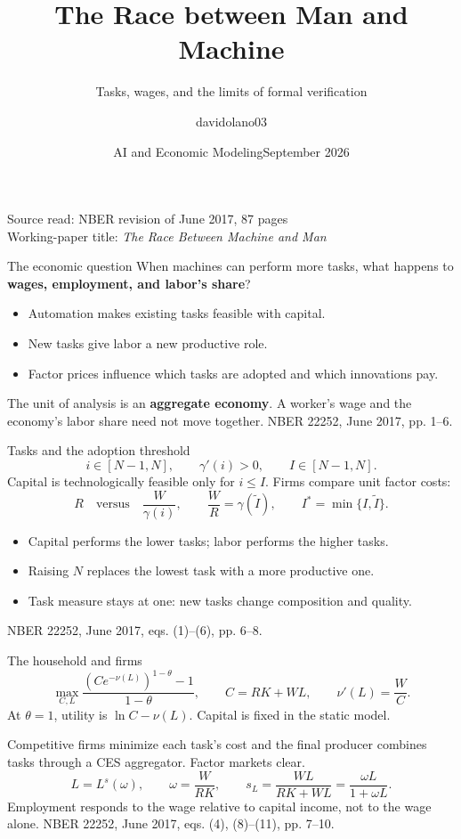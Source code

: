 \documentclass[aspectratio=169,11pt]{beamer}
\title{The Race between Man and Machine}
\subtitle{Tasks, wages, and the limits of formal verification}
\author{davidolano03}
\institute{Acemoglu \& Restrepo (2018), American Economic Review\\[5pt]
\href{https://github.com/davidolano03/ai-06-restrepo}{\texttt{github.com/davidolano03/ai-06-restrepo}}}
\date{AI and Economic Modeling\quad September 2026}
\newcommand{\src}[1]{\vfill{\scriptsize\color{gray}NBER 22252, June 2017, #1.}}
\begin{document}
\begin{frame}\titlepage
\vspace{-5mm}\centering\footnotesize Source read: NBER revision of June 2017, 87 pages\\
Working-paper title: \emph{The Race Between Machine and Man}
\end{frame}

\begin{frame}{The economic question}
When machines can perform more tasks, what happens to \textbf{wages, employment, and labor's share}?
\par\medskip
\begin{itemize}
\item Automation makes existing tasks feasible with capital.
\item New tasks give labor a new productive role.
\item Factor prices influence which tasks are adopted and which innovations pay.
\end{itemize}
\par\medskip
The unit of analysis is an \textbf{aggregate economy}. A worker's wage and the economy's labor share need not move together.
\src{pp. 1--6}
\end{frame}

\begin{frame}{Tasks and the adoption threshold}
\[
i\in[N-1,N],\qquad \gamma'(i)>0,\qquad I\in[N-1,N].
\]
Capital is technologically feasible only for $i\le I$. Firms compare unit factor costs:
\[
R\quad\text{versus}\quad\frac{W}{\gamma(i)},\qquad
\frac W R=\gamma(\widetilde I),\qquad I^*=\min\{I,\widetilde I\}.
\]
\begin{itemize}
\item Capital performs the lower tasks; labor performs the higher tasks.
\item Raising $N$ replaces the lowest task with a more productive one.
\item Task measure stays at one: new tasks change composition and quality.
\end{itemize}
\src{eqs. (1)--(6), pp. 6--8}
\end{frame}

\begin{frame}{The household and firms}
\[
\max_{C,L}\frac{(Ce^{-\nu(L)})^{1-\theta}-1}{1-\theta},
\qquad C=RK+WL,\qquad \nu'(L)=\frac WC.
\]
At $\theta=1$, utility is $\ln C-\nu(L)$. Capital is fixed in the static model.
\par\medskip
Competitive firms minimize each task's cost and the final producer combines tasks through a CES aggregator. Factor markets clear.
\[
L=L^s(\omega),\qquad \omega=\frac{W}{RK},\qquad
s_L=\frac{WL}{RK+WL}=\frac{\omega L}{1+\omega L}.
\]
Employment responds to the wage relative to capital income, not to the wage alone.
\src{eqs. (4), (8)--(11), pp. 7--10}
\end{frame}
\end{document}
